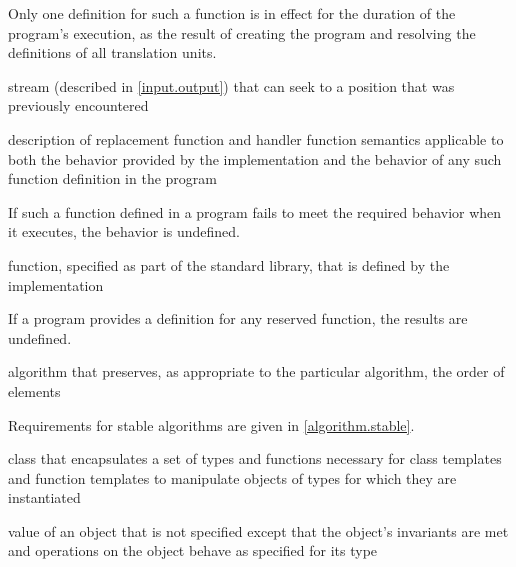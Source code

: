 \begin{defnote}
Only one definition for such a function is in effect for the duration of the program's
execution, as the result of creating the program and resolving the
definitions of all translation units.
\end{defnote}

%
stream (described in \ref{input.output}) that can seek to a position that was
previously encountered

%
description of replacement function and handler function semantics
applicable to both the behavior provided by the implementation and
the behavior of any such function definition in the program

\begin{defnote}
If such a function defined in a \Cpp{} program fails to meet the required
behavior when it executes, the behavior is undefined.%
\end{defnote}

%
function, specified as part of the \Cpp{} standard library, that is defined by the
implementation

\begin{defnote}
If a \Cpp{} program provides a definition for any reserved function, the results are undefined.%
\end{defnote}

%
%
algorithm that preserves, as appropriate to the particular algorithm, the order
of elements

\begin{defnote}
Requirements for stable algorithms are given in \ref{algorithm.stable}.
\end{defnote}

%
class that encapsulates a set of types and functions necessary for class templates and
function templates to manipulate objects of types for which they are instantiated

%
value of an object that is not specified except that the object's invariants are
met and operations on the object behave as specified for its type

